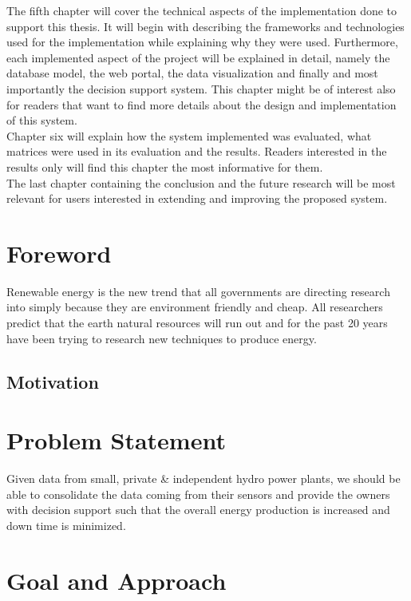 \indent The fifth chapter will cover the technical aspects of the implementation done to support this thesis. It will begin with describing the frameworks and technologies used for the implementation while explaining why they were used. Furthermore, each implemented aspect of the project will be explained in detail, namely the database model, the web portal, the data visualization and finally and most importantly the decision support system. This chapter might be of interest also for readers that want to find more details about the design and implementation of this system.\\
\indent Chapter six will explain how the system implemented was evaluated, what matrices were used in its evaluation and the results. Readers interested in the results only will find this chapter the most informative for them.\\
\indent The last chapter containing the conclusion and the future research will be most relevant for users interested in extending and improving the proposed system.\\
\section{Foreword}
\label{sec:Foreword}
\indent Renewable energy is the new trend that all governments are directing research into simply because they are environment friendly and cheap. All researchers predict that the earth natural resources will run out and for the past 20 years have been trying to research new techniques to produce energy.\cite{SEIT2017} \\
\subsection{Motivation}          
\label{subsec:Motivation}
\section{Problem Statement}
\label{sec:Problem Statement}
\indent Given data from small, private \& independent hydro power plants, we should be able to consolidate the data coming from their sensors and provide the owners with decision support such that the overall energy production is increased and down time is minimized. \\
\section{Goal and Approach}
\label{sec:GoalAndApproach}
